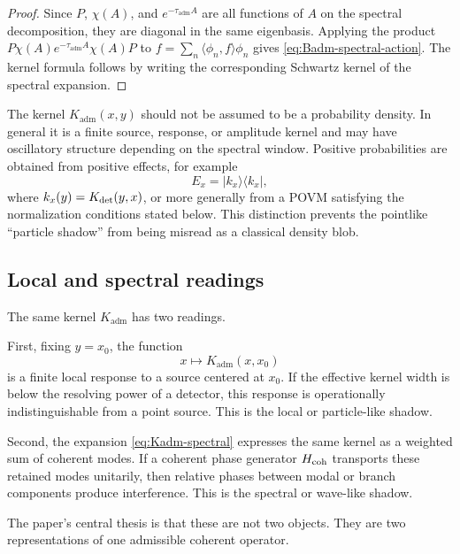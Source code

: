 \documentclass[11pt]{article}
\newcommand{\Kadm}{K_{\mathrm{adm}}}
\newcommand{\ta}{\tau_{\mathrm{adm}}}
\begin{document}
\begin{proof}
Since \(P\), \(\chi(A)\), and \(e^{-\ta A}\) are all functions of \(A\) on the spectral
decomposition, they are diagonal in the same eigenbasis. Applying the product
\(P\chi(A)e^{-\ta A}\chi(A)P\) to \(f=\sum_n\langle\phi_n,f\rangle\phi_n\) gives
\eqref{eq:Badm-spectral-action}. The kernel formula follows by writing the corresponding
Schwartz kernel of the spectral expansion.
\end{proof}

\begin{remark}
\label{rem:kernel-not-density}
The kernel \(\Kadm(x,y)\) should not be assumed to be a probability density. In general it is
a finite source, response, or amplitude kernel and may have oscillatory structure depending on
the spectral window. Positive probabilities are obtained from positive effects, for example
\begin{equation}
  E_x=|k_x\rangle\langle k_x|,
\end{equation}
where \(k_x(y)=K_{\rm det}(y,x)\), or more generally from a POVM satisfying the normalization
conditions stated below. This distinction prevents the pointlike ``particle shadow'' from being
misread as a classical density blob.
\end{remark}

\subsection{Local and spectral readings}
\label{subsec:local-spectral-readings}

The same kernel \(\Kadm\) has two readings.

First, fixing \(y=x_0\), the function
\begin{equation}
  x\longmapsto \Kadm(x,x_0)
\end{equation}
is a finite local response to a source centered at \(x_0\). If the effective kernel width is below
the resolving power of a detector, this response is operationally indistinguishable from a point
source. This is the local or particle-like shadow.

Second, the expansion \eqref{eq:Kadm-spectral} expresses the same kernel as a weighted sum
of coherent modes. If a coherent phase generator \(H_{\rm coh}\) transports these retained
modes unitarily, then relative phases between modal or branch components produce interference.
This is the spectral or wave-like shadow.

The paper's central thesis is that these are not two objects. They are two representations of
one admissible coherent operator.
\end{document}
